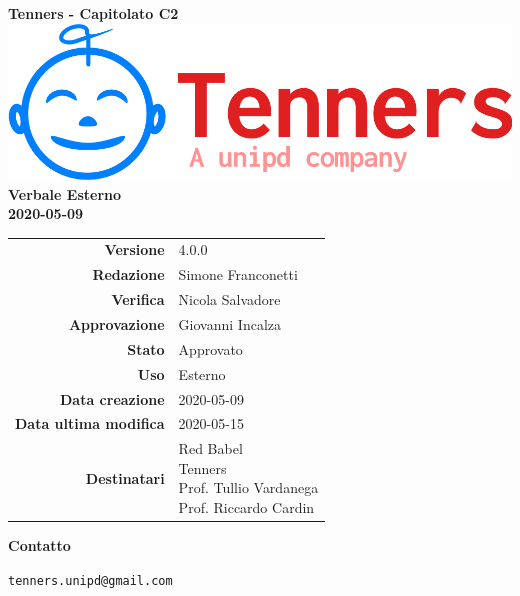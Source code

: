 \begin{titlepage}
	\begin{center}
		\large \textbf{Tenners - Capitolato C2}
		\vfill
		\includegraphics[scale = 0.3]{./res/img/logo.png}\\
		\vfill
		\Huge \textbf{Verbale Esterno} \\
		\textbf {2020-05-09}

        \vfill
        \large

        \begin{tabular}{r|l}
        	\textbf{Versione} & 4.0.0 \\
        	\textbf{Redazione} & Simone Franconetti \\
        	\textbf{Verifica} &  Nicola Salvadore \\
        	\textbf{Approvazione} & Giovanni Incalza \\
        	\textbf{Stato} & Approvato \\
        	\textbf{Uso} &  Esterno\\
        	\textbf{Data creazione} &  2020-05-09\\
        	\textbf{Data ultima modifica} & 2020-05-15 \\
        	\textbf{Destinatari} & \parbox[t]{5cm}{Red Babel\\Tenners \\ Prof. Tullio Vardanega\\ Prof. Riccardo Cardin}
        \end{tabular}
    	\vfill
    	\normalsize
    	\vfill
    	\textbf{Contatto}

    	\texttt{tenners.unipd@gmail.com}

	\end{center}
\end{titlepage}
